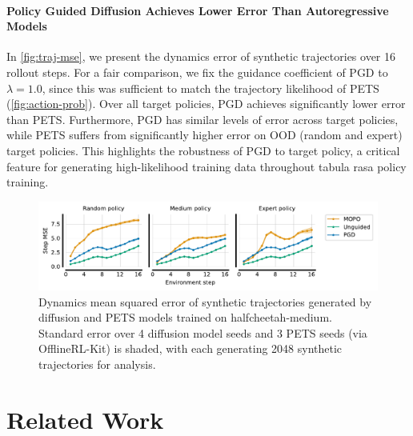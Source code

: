 \documentclass[10pt]{article} %
\theoremstyle{plain}
\theoremstyle{definition}
\theoremstyle{remark}
\begin{document}
\paragraph{Policy Guided Diffusion Achieves Lower Error Than Autoregressive Models}
In \autoref{fig:traj-mse}, we present the dynamics error of synthetic trajectories over 16 rollout steps.
For a fair comparison, we fix the guidance coefficient of PGD to $\lambda = 1.0$, since this was sufficient to match the trajectory likelihood of PETS (\autoref{fig:action-prob}).
Over all target policies, PGD achieves significantly lower error than PETS.
Furthermore, PGD has similar levels of error across target policies, while PETS suffers from significantly higher error on OOD (random and expert) target policies.
This highlights the robustness of PGD to target policy, a critical feature for generating high-likelihood training data throughout tabula rasa policy training.

\begin{figure}[t]
    \centering
    \includegraphics[width=\linewidth]{figs/step_mse.pdf}
    \caption{Dynamics mean squared error of synthetic trajectories generated by diffusion and PETS models trained on halfcheetah-medium.
    Standard error over 4 diffusion model seeds and 3 PETS seeds (via OfflineRL-Kit) is shaded, with each generating 2048 synthetic trajectories for analysis.
    }
    \label{fig:traj-mse}
\end{figure}













\section{Related Work}
\label{sec:related_work}
\end{document}
